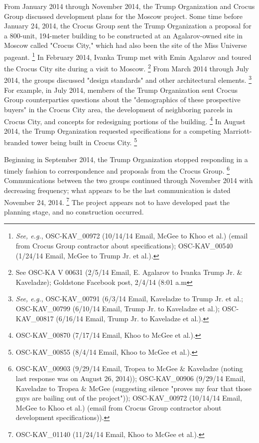 From January 2014 through November 2014, the Trump Organization and Crocus Group discussed development plans for the Moscow project.
Some time before January 24, 2014, the Crocus Group sent the Trump Organization a proposal for a 800-unit, 194-meter building to be constructed at an Agalarov-owned site in Moscow called "Crocus City," which had also been the site of the Miss Universe pageant.%
\footnote{\textit{See, e.g.}, OSC-KAV\_00972 (10/14/14 Email, McGee to Khoo et al.) (email from Crocus Group contractor about specifications); OSC-KAV\_00540 (1/24/14 Email, McGee to Trump Jr. et al.).}
In February 2014, Ivanka Trump met with Emin Agalarov and toured the Crocus City site during a visit to Moscow.%
\footnote{See OSC-KA V 00631 (2/5/14 Email, E. Agalarov to Ivanka Trump Jr. \& Kaveladze); Goldstone Facebook post, 2/4/14 (8:01 a.m} 
From March 2014 through July 2014, the groups discussed "design standards" and other architectural elements.%
\footnote{\textit{See, e.g.}, OSC-KAV\_00791 (6/3/14 Email, Kaveladze to Trump Jr. et al.; OSC-KAV\_00799 (6/10/14 Email, Trump Jr. to Kaveladze et al.); OSC-KAV\_00817 (6/16/14 Email, Trump Jr. to Kaveladze et al.).}
For example, in July 2014, members of the Trump Organization sent Crocus Group counterparties questions about the "demographics of these prospective buyers" in the Crocus City area, the development of neighboring parcels in Crocus City, and concepts for redesigning portions of the building.%
\footnote{OSC-KAV\_00870 (7/17/14 Email, Khoo to McGee et al.).}
In August 2014, the Trump Organization requested specifications for a competing Marriott-branded tower being built in Crocus City.%
\footnote{OSC-KAV\_00855 (8/4/14 Email, Khoo to McGee et al.).}

Beginning in September 2014, the Trump Organization stopped responding in a timely fashion to correspondence and proposals from the Crocus Group.%
\footnote{OSC-KAV\_00903 (9/29/14 Email, Tropea to McGee \& Kaveladze (noting last response was on August 26, 2014)); OSC-KAV\_00906 (9/29/14 Email, Kaveladze to Tropea \& McGee (suggesting silence "proves my fear that those guys are bailing out of the project")); OSC-KAV\_00972 (10/14/14 Email, McGee to Khoo et al.) (email from Crocus Group contractor about development specifications)).}
Communications between the two groups continued through November 2014 with decreasing frequency; what appears to be the last communication is dated November 24, 2014.%
\footnote{OSC-KAV\_01140 (11/24/14 Email, Khoo to McGee et al.).}
The project appears not to have developed past the planning stage, and no construction occurred.

